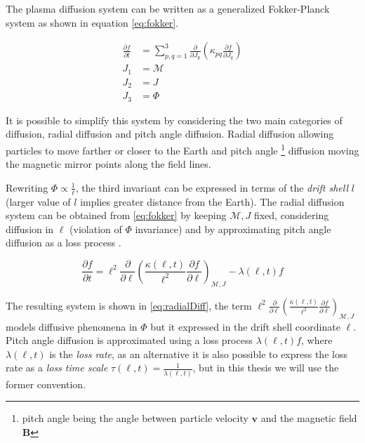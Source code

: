 The plasma diffusion system \citep{schulz2012particle} can be written as a generalized Fokker-Planck system as shown 
in equation \ref{eq:fokker}.

\begin{align}\label{eq:fokker}
    \frac{\partial{f}}{\partial{t}} &= \sum^{3}_{p,q = 1}
    \frac{\partial}{\partial{J_{p}}} \left( \kappa_{pq}
    \frac{\partial{f}}{\partial{J_{q}}} \right) \\
    J_1 &= \mathcal{M} \\
    J_2 &= J \\
    J_{3} &= \Phi
\end{align}

It is possible to simplify this system by considering the two main categories of diffusion, radial diffusion and 
pitch angle diffusion. Radial diffusion allowing particles to move farther or closer to the Earth and pitch angle 
\footnote{pitch angle being the angle between particle velocity $\mathbf{v}$ and the magnetic field $\mathbf{B}$} 
diffusion moving the magnetic mirror points along the field lines.

Rewriting $\Phi \propto \frac{1}{\ell}$, the third invariant can be expressed in terms of the 
\emph{drift shell} $l$ (larger value of $l$ implies greater distance from the Earth). The radial diffusion system 
can be obtained from \ref{eq:fokker} by keeping $\mathcal{M}, J$ fixed, considering diffusion in $\ell$ 
(violation of $\Phi$ invariance) and by approximating pitch angle diffusion as a loss process 
\citep{roederer2012dynamics,Walt1970}.  

\begin{equation}\label{eq:radialDiff}
    \frac{\partial{f}}{\partial{t}} = \ell^2 \frac{\partial}{\partial{\ell}} \left( \frac{\kappa(\ell,
        t)}{\ell^{2}} \frac{\partial{f}}{\partial{\ell}}
    \right)_{\mathcal{M}, J} - \lambda(\ell,t) f
\end{equation}

The resulting system is shown in \ref{eq:radialDiff}, the term 
$\ell^2 \frac{\partial}{\partial{\ell}} \left( \frac{\kappa(\ell,t)}{\ell^{2}} \frac{\partial{f}}{\partial{\ell}}
\right)_{\mathcal{M}, J}$ models diffusive phenomena in $\Phi$ but it expressed in the drift shell coordinate $\ell$. 
Pitch angle diffusion is approximated using a loss process $\lambda(\ell,t) f$, where $\lambda(\ell,t)$ is the 
\emph{loss rate}, as an alternative it is also possible to express the loss rate as a \emph{loss time scale} 
$\tau(\ell,t) = \frac{1}{\lambda(\ell,t)}$, but in this thesis we will use the former convention.

